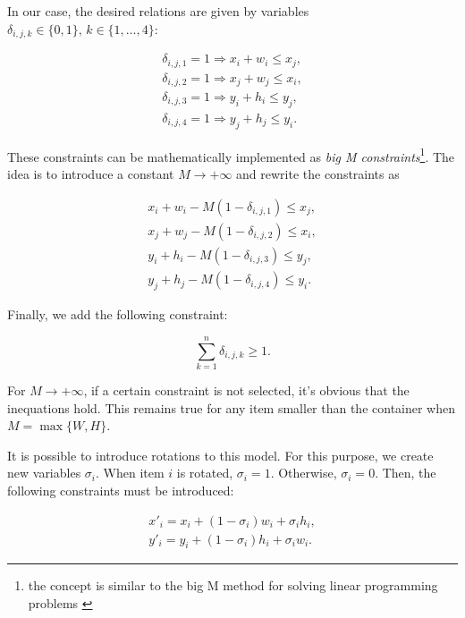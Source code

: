 In our case, the desired relations are given by variables $\delta_{i,j,k} \in \{0,1\}, \, k \in \{1,\dots,4\}$:

\begin{align}
    \delta_{i,j,1} = 1 \Rightarrow x_i + w_i \leq x_j,\\
    \delta_{i,j,2} = 1 \Rightarrow x_j + w_j \leq x_i,\\
    \delta_{i,j,3} = 1 \Rightarrow y_i + h_i \leq y_j,\\
    \delta_{i,j,4} = 1 \Rightarrow y_j + h_j \leq y_i.
\end{align}

These constraints can be mathematically implemented as \emph{big M constraints}\footnote{the concept is similar to the big M method for solving linear programming problems \cite{BAZARAA2010,BERTSIMAS1997}}. The idea is to introduce a constant $M \to +\infty$ and rewrite the constraints as

\begin{align}
    x_i + w_i - M(1 - \delta_{i,j,1}) \leq x_j,\\
    x_j + w_j - M(1 - \delta_{i,j,2}) \leq x_i,\\
    y_i + h_i - M(1 - \delta_{i,j,3}) \leq y_j,\\
    y_j + h_j - M(1 - \delta_{i,j,4}) \leq y_i.
\end{align}

Finally, we add the following constraint:

\begin{equation}
    \sum_{k=1}^{n} \delta_{i,j,k} \geq 1.
\end{equation}

For $M \to +\infty$, if a certain constraint is not selected, it's obvious that the inequations hold. This remains true for any item smaller than the container when $M = \max\{W,H\}$.

It is possible to introduce rotations to this model. For this purpose, we create new variables $\sigma_i$. When item $i$ is rotated, $\sigma_i = 1$. Otherwise, $\sigma_i = 0$. Then, the following constraints must be introduced:

\begin{align}
    x'_i = x_i + (1-\sigma_i)w_i + \sigma_i h_i,\\
    y'_i = y_i + (1-\sigma_i)h_i + \sigma_i w_i.
\end{align}


